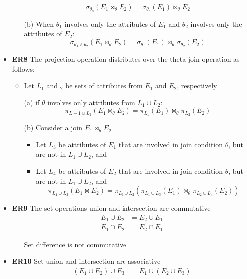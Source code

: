 \begin{itemize}[label=\(\rhd\)]
\begin{itemize}[label=\(\rhd\)]
\[        \sigma_{\theta_o}(E_1 \bowtie_\theta E_2) = \sigma_{\theta_o}(E_1) \bowtie_\theta E_2
        \]
        \item[(b)] When $\theta_1$ involves only the attributes of $E_1$ and $\theta_2$ involves only the attributes of $E_2$: \[
        \sigma_{\theta_1 \land \theta_2}(E_1 \bowtie_\theta E_2) = \sigma_{\theta_1}(E_1) \bowtie_\theta \sigma_{\theta_2}(E_2)
        \] 
    \end{itemize}
    \item \textbf{ER8} The projection operation distributes over the theta join operation as follows:
    \begin{itemize}[label=\(\rhd\)]
        \item Let $L_1$ and $_2$ be sets of attributes from $E_1$ and $E_2$, respectively
        \item[(a)] if $\theta$ involves only attributes from $L_1 \cup L_2$:\[
        \pi_{L-1\cup L_2}(E_1 \bowtie_\theta E_2) = \pi_{L_1}(E_1) \bowtie_\theta \pi_{L_2}(E_2)
        \]
        \item[(b)] Consider a join $E_1 \bowtie_\theta E_2$
        \begin{itemize}[label=\(\rhd\)]
            \item Let $L_3$ be attributes of $E_1$ that are involved in join condition $\theta$, but are not in $L_1 \cup L_2$, and 
            \item Let $L_4$ be attributes of $E_2$ that are involved in join condition $\theta$, but are not in $L_1 \cup L_2$, and \[
            \pi_{L_1 \cup L_2}(E_1 \bowtie E_2) = \pi_{L_1 \cup L_2}(\pi_{L_1 \cup L_3}(E_1)\bowtie_\theta \pi_{L_2 \cup L_4}(E_2))
            \]
        \end{itemize}
    \end{itemize} 
    \item \textbf{ER9} The set operations union and intersection are commutative
    \begin{align*}
        E_1 \cup E_2 &= E_2 \cup E_1\\
        E_1 \cap E_2 &= E_2 \cap E_1
    \end{align*}
    \begin{itemize}[label=\(\rhd\)]
        \item[] Set difference is not commutative
    \end{itemize}
    \item \textbf{ER10} Set union and intersection are associative
    \begin{align*}
        (E_1 \cup E_2)\cup E_3 &= E_1 \cup (E_2\cup E_3)\\

\end{align*}
\end{itemize}

